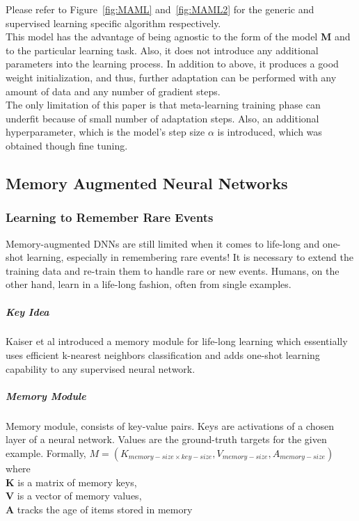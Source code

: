 Please refer to Figure~\ref{fig:MAML} and~\ref{fig:MAML2} for the generic and supervised learning specific algorithm respectively.\\

This model has the advantage of being agnostic to the form of the model \textbf{M} and to the particular learning task. Also, it does not introduce any additional parameters into the learning process. In addition to above, it produces a good weight initialization, and thus, further adaptation can be performed with any amount of data and any number of gradient steps.\\

The only limitation of this paper is that meta-learning training phase can underfit because of small number of adaptation steps. Also, an additional hyperparameter, which is the model's step size $\alpha$ is introduced, which was obtained though fine tuning.

\subsection{Memory Augmented Neural Networks}

\subsubsection{Learning to Remember Rare Events}
Memory-augmented DNNs are still limited when it comes to life-long and one-shot learning, especially in remembering rare events! It is necessary to extend the training data and re-train them to handle rare or new events. Humans, on the other hand, learn in a life-long fashion, often from single examples.

\subparagraph{Key Idea}Kaiser et al\cite{45801} introduced a memory module for life-long learning which essentially uses efficient k-nearest neighbors classification and adds one-shot learning capability to any supervised neural network.

\subparagraph{Memory Module}Memory module, consists of key-value pairs. Keys are activations of a chosen layer of a neural network. Values are the ground-truth targets for the given example. Formally, \newline  
$M = (K_{memory-size×key-size}, V_{memory-size}, A_{memory-size})$ where \\
  		\tab \textbf{K} is a matrix of memory keys,\\ 
        \tab \textbf{V} is a vector of memory values, \\
        \tab \textbf{A} tracks the age of items stored in memory\\

